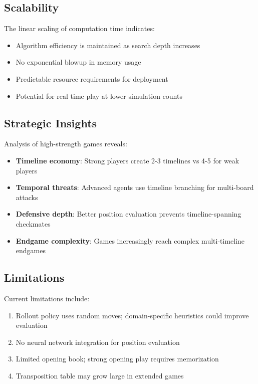 \documentclass[11pt,a4paper]{article}
\begin{document}
\subsection{Scalability}

The linear scaling of computation time indicates:
\begin{itemize}
    \item Algorithm efficiency is maintained as search depth increases
    \item No exponential blowup in memory usage
    \item Predictable resource requirements for deployment
    \item Potential for real-time play at lower simulation counts
\end{itemize}

\subsection{Strategic Insights}

Analysis of high-strength games reveals:
\begin{itemize}
    \item \textbf{Timeline economy}: Strong players create 2-3 timelines vs 4-5 for weak players
    \item \textbf{Temporal threats}: Advanced agents use timeline branching for multi-board attacks
    \item \textbf{Defensive depth}: Better position evaluation prevents timeline-spanning checkmates
    \item \textbf{Endgame complexity}: Games increasingly reach complex multi-timeline endgames
\end{itemize}

\subsection{Limitations}

Current limitations include:
\begin{enumerate}
    \item Rollout policy uses random moves; domain-specific heuristics could improve evaluation
    \item No neural network integration for position evaluation
    \item Limited opening book; strong opening play requires memorization
    \item Transposition table may grow large in extended games
\end{enumerate}
\end{document}
